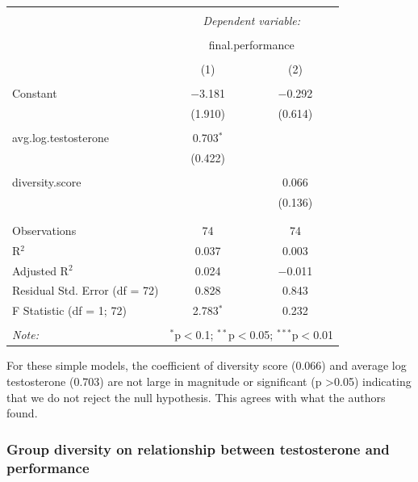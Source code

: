 \documentclass[]{article}
\begin{document}
\begin{table}[!htbp] \centering 
  \caption{} 
  \label{} 
\begin{tabular}{@{\extracolsep{5pt}}lcc} 
\\[-1.8ex]\hline 
\hline \\[-1.8ex] 
 & \multicolumn{2}{c}{\textit{Dependent variable:}} \\ 
\cline{2-3} 
\\[-1.8ex] & \multicolumn{2}{c}{final.performance} \\ 
\\[-1.8ex] & (1) & (2)\\ 
\hline \\[-1.8ex] 
 Constant & $-$3.181 & $-$0.292 \\ 
  & (1.910) & (0.614) \\ 
  & & \\ 
 avg.log.testosterone & 0.703$^{*}$ &  \\ 
  & (0.422) &  \\ 
  & & \\ 
 diversity.score &  & 0.066 \\ 
  &  & (0.136) \\ 
  & & \\ 
\hline \\[-1.8ex] 
Observations & 74 & 74 \\ 
R$^{2}$ & 0.037 & 0.003 \\ 
Adjusted R$^{2}$ & 0.024 & $-$0.011 \\ 
Residual Std. Error (df = 72) & 0.828 & 0.843 \\ 
F Statistic (df = 1; 72) & 2.783$^{*}$ & 0.232 \\ 
\hline 
\hline \\[-1.8ex] 
\textit{Note:}  & \multicolumn{2}{r}{$^{*}$p$<$0.1; $^{**}$p$<$0.05; $^{***}$p$<$0.01} \\ 
\end{tabular} 
\end{table}

For these simple models, the coefficient of diversity score (0.066) and
average log testosterone (0.703) are not large in magnitude or
significant (p \textgreater{}0.05) indicating that we do not reject the
null hypothesis. This agrees with what the authors found.

\hypertarget{group-diversity-on-relationship-between-testosterone-and-performance}{%
\subsubsection{Group diversity on relationship between testosterone and
performance}\label{group-diversity-on-relationship-between-testosterone-and-performance}}
\end{document}
